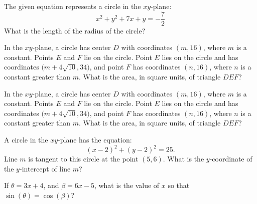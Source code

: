 \noindent\markforreview
\vspace{1em}

The given equation represents a circle in the $xy$-plane:
\[
x^2 + y^2 + 7x + y = -\frac{7}{2}
\]
What is the length of the radius of the circle?

\vspace{2em}

\noindent\markforreview
\vspace{1em}

In the $xy$-plane, a circle has center $D$ with coordinates $(m,16)$, where $m$ is a constant. Points $E$ and $F$ lie on the circle. Point $E$ lies on the circle and has coordinates $\bigl(m + 4\sqrt{10}, 34\bigr)$, and point $F$ has coordinates $(n,16)$, where $n$ is a constant greater than $m$. What is the area, in square units, of triangle $DEF$?


\vspace{2em}

\noindent\markforreview
\vspace{1em}

In the $xy$-plane, a circle has center $D$ with coordinates $(m,16)$, where $m$ is a constant. Points $E$ and $F$ lie on the circle. Point $E$ lies on the circle and has coordinates $\bigl(m + 4\sqrt{10}, 34\bigr)$, and point $F$ has coordinates $(n,16)$, where $n$ is a constant greater than $m$. What is the area, in square units, of triangle $DEF$?


\vspace{2em}

\noindent\markforreview
\vspace{1em}

A circle in the $xy$-plane has the equation:
\[
(x - 2)^2 + (y - 2)^2 = 25.
\]
Line $m$ is tangent to this circle at the point $(5,6)$. What is the $y$-coordinate of the $y$-intercept of line $m$?

\vspace{2em}

\noindent\markforreview
\vspace{1em}

If $\theta = 3x + 4$, and $\beta = 6x - 5$, what is the value of $x$ so that $\sin(\theta) = \cos(\beta)$?

